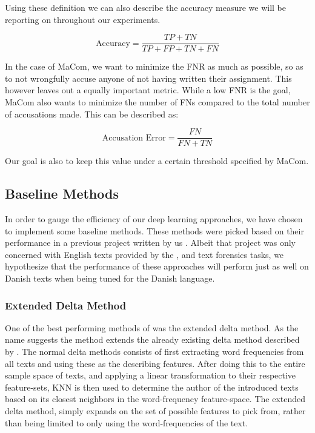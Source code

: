 Using these definition we can also describe the accuracy measure we will be
reporting on throughout our experiments.

\begin{equation}
    \text{Accuracy} = \frac{TP + TN}{TP + FP + TN + FN}
\end{equation}


In the case of MaCom, we want to minimize the \gls{FNR} as much as possible, so
as to not wrongfully accuse anyone of not having written their assignment.
This however leaves out a equally important metric. While a low \gls{FNR}
is the goal, MaCom also wants to minimize the number of \gls{FN}s compared
to the total number of accusations made. This can be described as:

\begin{equation}
    \text{Accusation Error} = \frac{FN}{FN + TN}
\end{equation}

Our goal is also to keep this value under a certain threshold specified by
MaCom.


\subsection{Baseline Methods}

In order to gauge the efficiency of our deep learning approaches, we have chosen
to implement some baseline methods. These methods were picked based on their
performance in a previous project written by us \cite{US}. Albeit that project
was only concerned with English texts provided by the \cite{pan:2015}, and
\cite{pan:2014} text forensics tasks, we hypothesize that the performance of
these approaches will perform just as well on Danish texts when being tuned for
the Danish language.


\subsubsection{Extended Delta Method}

One of the best performing methods of \cite{US} was the extended delta method.
As the name suggests the method extends the already existing delta method
described by \cite{evert2015towards}. The normal delta methods consists of first
extracting word frequencies from all texts and using these as the describing
features. After doing this to the entire sample space of texts, and applying a
linear transformation to their respective feature-sets, \gls{KNN} is then used
to determine the author of the introduced texts based on its closest neighbors
in the word-frequency feature-space. The extended delta method, simply expands
on the set of possible features to pick from, rather than being limited to only
using the word-frequencies of the text.


